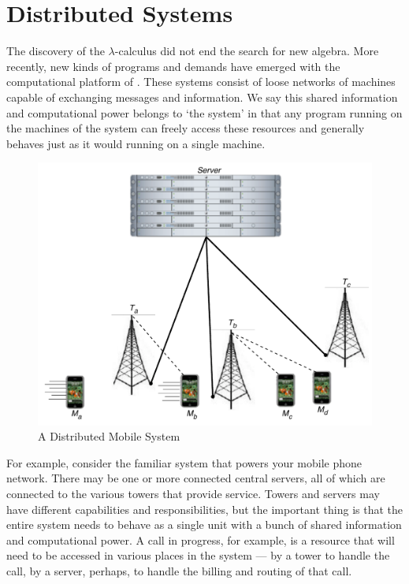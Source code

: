\section{Distributed Systems}
The discovery of the $\lambda$-calculus did not end the search for new algebra.  
More recently, new kinds of programs and demands have emerged with the computational platform of .  
These systems consist of loose networks of machines capable of exchanging messages and information.  
We say this shared information and computational power belongs to `the system' in that any program running on the machines of the system can freely access these resources and generally behaves just as it would running on a single machine.
\begin{figure}[H]
\centering
\includegraphics[scale=0.7]{figures/cell_network.pdf} %
\caption{A Distributed Mobile System}
\label{fig_cell_network}
\end{figure}

For example, consider the familiar system that powers your mobile phone network.  
There may be one or more connected central servers, all of which are connected to the various towers that provide service.  
Towers and servers may have different capabilities and responsibilities, but the important thing is that the entire system needs to behave as a single unit with a bunch of shared information and computational power.  
A call in progress, for example, is a resource that will need to be accessed in various places in the system ---  by a tower to handle the call, by a server, perhaps, to handle the billing and routing of that call.  

